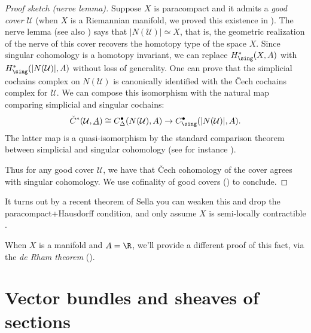 \documentclass[11pt]{amsart}
\begin{document}
\begin{proof}[Proof sketch (nerve lemma)]
Suppose $X$ is paracompact and it admits a \emph{good cover} $\mathcal{U}$ (when $X$ is a Riemannian manifold, we proved this existence in ). The nerve lemma \cite[\S5]{weilTheoremesRham1952} (see also \cite[4G.3]{Hatcher}) says that $|N(\mathcal{U})| \simeq X$, that is, the geometric realization of the nerve of this cover recovers the homotopy type of the space $X$. Since singular cohomology is a homotopy invariant, we can replace $H^\ast_\sing(X,A)$ with $H^\ast_\sing(|N(\mathcal{U})|,A)$ without loss of generality. One can prove that the simplicial cochains complex on $N(\mathcal{U})$ is canonically identified with the \v{C}ech cochains complex for $\mathcal{U}$. We can compose this isomorphism with the natural map comparing simplicial and singular cochains:
\begin{align*}
    \check{C}^\ast(\mathcal{U},\underline{A}) \cong C_\Delta^\bullet(N(\mathcal{U}),A) \to C_\sing^\bullet(|N(\mathcal{U})|,A).
\end{align*}
The latter map is a quasi-isomorphism by the standard comparison theorem between simplicial and singular cohomology (see for instance \cite[\S2.1]{Hatcher}).

Thus for any good cover $\mathcal{U}$, we have that \v{C}ech cohomology of the cover agrees with singular cohomology. We use cofinality of good covers () to conclude.
\end{proof}

\begin{remark} It turns out by a recent theorem of Sella you can weaken this and drop the paracompact+Hausdorff condition, and only assume $X$ is semi-locally contractible \cite{Sella-sheaf-cohomology}.
\end{remark}

\begin{remark} When $X$ is a manifold and $A=\R$, we'll provide a different proof of this fact, via the \emph{de Rham theorem} ().
\end{remark}

\newpage
\section{Vector bundles and sheaves of sections}
\end{document}

